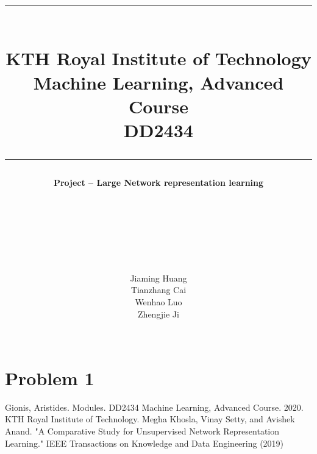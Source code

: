 \documentclass[a4paper]{article}
\title{\rule[0.5cm]{\textwidth}{0.1mm}
\\KTH Royal Institute of Technology
\\\vspace{0.5em}
Machine Learning, Advanced Course
\\\vspace{0.5em}
DD2434
\\\rule[0cm]{\textwidth}{0.1mm}\vspace{6em}}
\author
{\Large\textbf{{Project -- Large Network representation learning}}
\\\\\\\\\\\\\\\\\vspace{0.2em}
\Large{Jiaming Huang}\\\vspace{0.2em}
\Large{Tianzhang Cai}\\\vspace{0.2em}
\Large{Wenhao Luo}\\\vspace{0.2em}
\Large{Zhengjie Ji}
\\\\\vspace{3em}}
\begin{document}

\maketitle
\thispagestyle{empty}

\newpage
\tableofcontents
\thispagestyle{empty}

\newpage
\setcounter{page}{1}

\section{Problem 1}

\newpage{}
\begin{thebibliography}{1}
 Gionis, Aristides. Modules. DD2434 Machine Learning, Advanced Course. 2020. KTH Royal Institute of Technology.
 Megha Khosla, Vinay Setty, and Avishek Anand. "A Comparative Study for Unsupervised Network Representation Learning." IEEE Transactions on Knowledge and Data Engineering (2019)
\end{thebibliography}
\end{document}

